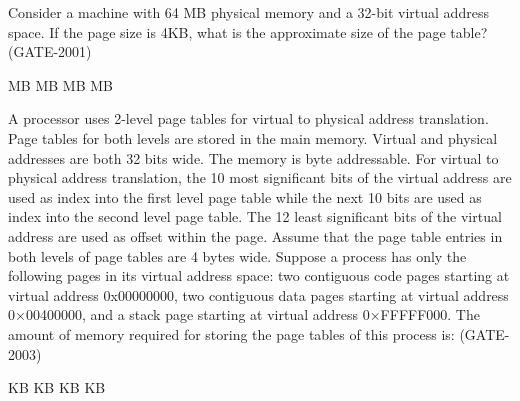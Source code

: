 
\begin{questyle}

  \question  Consider a machine with 64 MB physical memory and a 32-bit virtual address space. If the page size is 4KB, what
              is the approximate size of the page table?(GATE-2001)

  \begin{choices}
     MB
     MB
     MB
     MB
  \end{choices}

\end{questyle}


\begin{questyle}

  \question  A processor uses 2-level page tables for virtual to physical address translation. Page tables for
             both levels are stored in the main memory. Virtual and physical addresses are both 32 bits wide.
             The memory is byte addressable. For virtual to physical address translation, the 10 most significant
             bits of the virtual address are used as index into the first level page table while the next 10 bits
             are used as index into the second level page table. The 12 least significant bits of the virtual
             address are used as offset within the page. Assume that the page table entries in both levels of
             page tables are 4 bytes wide.
             Suppose a process has only the following pages in its virtual address space: two contiguous code
             pages starting at virtual address 0x00000000, two contiguous data pages starting at virtual
             address 0×00400000, and a stack page starting at virtual address 0×FFFFF000. The amount of memory
             required for storing the page tables of this process is: (GATE-2003)

            \begin{choices}
               KB
               KB
               KB
               KB
            \end{choices}

\end{questyle}


